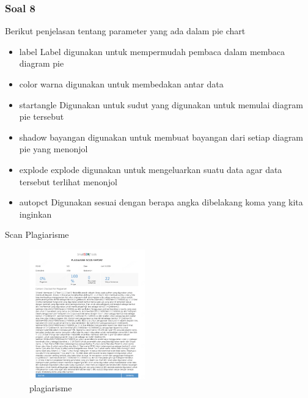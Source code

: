 \subsubsection{Soal 8}
\hfill \break
Berikut penjelasan tentang parameter yang ada dalam pie chart
\begin{itemize}
    \item label
    Label digunakan untuk mempermudah pembaca dalam membaca diagram pie
    \item color
    warna digunakan untuk membedakan antar data
    \item startangle
    Digunakan untuk sudut yang digunakan untuk memulai diagram pie tersebut
    \item shadow
    bayangan digunakan untuk membuat bayangan dari setiap diagram pie yang menonjol
    \item explode
    explode digunakan untuk mengeluarkan suatu data agar data tersebut terlihat menonjol
    \item autopct
    Digunakan sesuai dengan berapa angka dibelakang koma yang kita inginkan
\end{itemize}
\par Scan Plagiarisme
\begin{figure}[ht!]
\includegraphics[width=5cm]{figures/6/1174080/teori/PLAGIARISM.PNG}
\centering
\caption{plagiarisme}
\end{figure}



